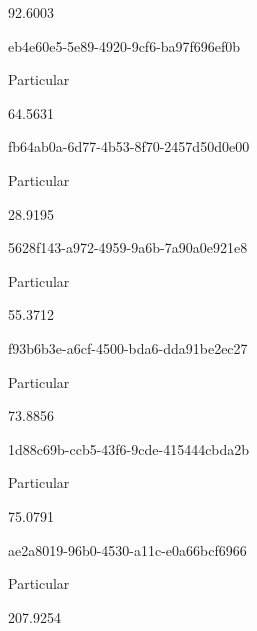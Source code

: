 \documentclass[
  11pt,
  a4paper,
  DIV=11,
  numbers=noendperiod]{scrartcl}
\begin{document}
92.6003

\n    

\n    

\n      

eb4e60e5-5e89-4920-9cf6-ba97f696ef0b

\n      

Particular

\n      

64.5631

\n    

\n    

\n      

fb64ab0a-6d77-4b53-8f70-2457d50d0e00

\n      

Particular

\n      

28.9195

\n    

\n    

\n      

5628f143-a972-4959-9a6b-7a90a0e921e8

\n      

Particular

\n      

55.3712

\n    

\n    

\n      

f93b6b3e-a6cf-4500-bda6-dda91be2ec27

\n      

Particular

\n      

73.8856

\n    

\n    

\n      

1d88c69b-ccb5-43f6-9cde-415444cbda2b

\n      

Particular

\n      

75.0791

\n    

\n    

\n      

ae2a8019-96b0-4530-a11c-e0a66bcf6966

\n      

Particular

\n      

207.9254
\end{document}
